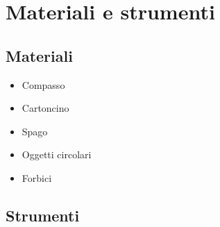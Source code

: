 \section*{Materiali e strumenti}
\subsection*{Materiali}
\begin{itemize}
  \item Compasso
  \item Cartoncino
  \item Spago
  \item Oggetti circolari 
  \item Forbici
\end{itemize}

\subsection*{Strumenti}

